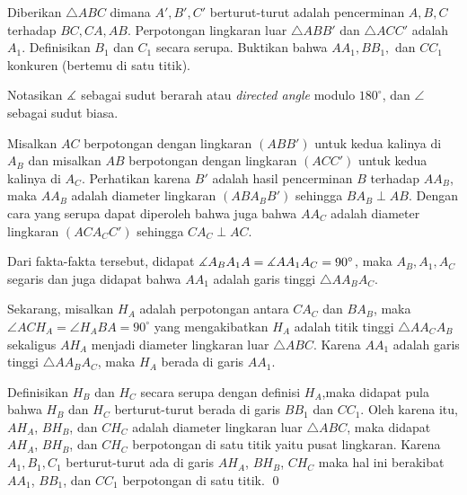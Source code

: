 \documentclass[12pt]{scrartcl}
\begin{document}
	\begin{soalbaru} 
		Diberikan $\triangle ABC$ dimana $A',B',C'$ berturut-turut adalah pencerminan $A,B,C$ terhadap $BC,CA,AB$. Perpotongan lingkaran luar $\triangle ABB'$ dan $\triangle ACC'$ adalah $A_1$. Definisikan $B_1$ dan $C_1$ secara serupa. Buktikan bahwa $AA_1,BB_1,$ dan $CC_1$ konkuren (bertemu di satu titik).\\[-10pt]
		
    \begin{solusi}
		Notasikan $\measuredangle$ sebagai sudut berarah atau \textit{ directed angle} modulo $180^\circ$, dan $\angle$ sebagai sudut biasa.
		
		Misalkan $AC$ berpotongan dengan lingkaran $(ABB')$ untuk kedua kalinya di $A_B$ dan misalkan $AB$ berpotongan dengan lingkaran $(ACC')$ untuk kedua kalinya di $A_C$. Perhatikan karena $B'$ adalah hasil pencerminan $B$ terhadap $AA_B$, maka $AA_B$ adalah diameter lingkaran $(ABA_BB')$ sehingga  $BA_B \perp AB$. Dengan cara yang serupa dapat diperoleh bahwa juga bahwa $AA_C$ adalah diameter lingkaran $(ACA_CC')$ sehingga $CA_C \perp AC$.
		
		Dari fakta-fakta tersebut, didapat $\measuredangle A_BA_1A = \measuredangle AA_1A_C = 90^\circ$, maka $A_B, A_1, A_C$ segaris dan juga didapat bahwa $AA_1$ adalah garis tinggi $\triangle AA_BA_C$.
		
		Sekarang, misalkan $H_A$ adalah perpotongan antara $CA_C$ dan $BA_B$, maka $\angle ACH_A = \angle H_ABA = 90^\circ$ yang mengakibatkan $H_A$ adalah titik tinggi $\triangle AA_CA_B$ sekaligus $AH_A$ menjadi diameter lingkaran luar $\triangle ABC$. Karena $AA_1$ adalah garis tinggi $\triangle AA_BA_C$, maka $H_A$ berada di garis $AA_1$.
		
		Definisikan $H_B$ dan $H_C$ secara serupa dengan definisi $H_A$,maka didapat pula bahwa $H_B$ dan $H_C$ berturut-turut berada di garis $BB_1$ dan $CC_1$. Oleh karena itu, $AH_A$, $BH_B$, dan $CH_C$ adalah diameter lingkaran luar $\triangle ABC$, maka didapat $AH_A$, $BH_B$, dan $CH_C$ berpotongan di satu titik yaitu pusat lingkaran. Karena $A_1,B_1,C_1$ berturut-turut ada di garis $AH_A$, $BH_B$, $CH_C$ maka hal ini berakibat $AA_1$, $BB_1$, dan $CC_1$ berpotongan di satu titik. \qed
                \begin{center}
\end{center}
\end{solusi}
\end{soalbaru}
\end{document}
